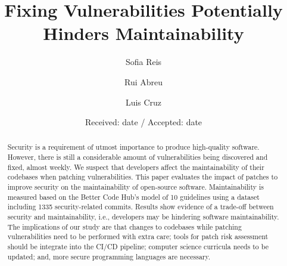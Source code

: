 \documentclass[smallextended]{svjour3}       %
\begin{document}
\title{Fixing Vulnerabilities Potentially Hinders Maintainability%
}


\author{Sofia Reis         \and
        Rui Abreu           \and
        Luis Cruz
}



\date{Received: date / Accepted: date}


\maketitle

\begin{abstract}
Security is a requirement of utmost importance to produce high-quality software. 
However, there is still a considerable amount of 
vulnerabilities being discovered and fixed, almost weekly. We suspect that developers 
affect the maintainability of their codebases when patching vulnerabilities. This paper evaluates the 
impact of patches to improve security on the maintainability of open-source 
software. Maintainability is measured based on the Better Code Hub’s model of 10 
guidelines using a dataset including 1335 security-related commits.
Results show evidence of a trade-off between security and maintainability, i.e., 
developers may be hindering software maintainability.
The implications of our study are that changes to codebases while patching 
vulnerabilities need to be performed with extra care; tools
for patch risk assessment should be integrate into the CI/CD pipeline; computer science
curricula needs to be updated; and, more secure programming languages are necessary.
\end{abstract}
\end{document}
